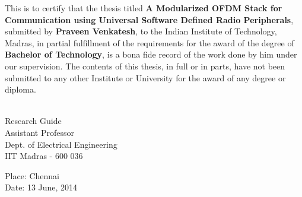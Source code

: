 \certificate

\vspace*{0.5in}

\noindent This is to certify that the thesis titled {\bf A Modularized OFDM
Stack for Communication using Universal Software Defined Radio Peripherals},
submitted by {\bf Praveen Venkatesh}, to the Indian Institute of Technology,
Madras, in partial fulfillment of the requirements for the award of the degree
of {\bf Bachelor of Technology}, is a bona fide record of the work done by him
under our supervision. The contents of this thesis, in full or in parts, have
not been submitted to any other Institute or University for the award of any
degree or diploma.

\vspace*{1.5in}

\begin{singlespacing}
\hspace*{-0.25in}
\parbox{2.5in}{
	 \\
	\noindent Research Guide \\
	\noindent Assistant Professor \\
	\noindent Dept. of Electrical Engineering\\
	\noindent IIT Madras - 600 036 \\
}
\hspace*{1.0in}
\end{singlespacing}

\vspace*{0.25in}

\noindent Place: Chennai \\
Date: 13 June, 2014
